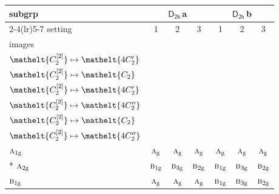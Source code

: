 \documentclass[10pt,a4paper]{article}
\numberwithin{equation}{section}
\newcommand{\eltfont}[1]{{\let\sigma\eltsigma\mathelt{#1}}}
\newcommand{\grp}[1]{\mathsf{#1}}
\newcommand{\irr}[1]{\text{\normalfont\scshape #1}}
\newcommand{\cls}[1]{\eltfont{#1}}
\newcommand{\ptag}[1]{\mathrm{#1}}
\newcommand{\clsletter}[1]{\,{\scriptsize\color{black!55}#1}}
\newcommand{\genidx}[2]{#1^{[\mathrm{#2}]}}
\begin{document}
{\small\begin{longtable}{@{}lcccccc@{}}\toprule
subgrp & \multicolumn{3}{c}{\href{D2h.pdf}{$\grp{D_{2h}}$}\clsletter{a}} & \multicolumn{3}{c}{\href{D2h.pdf}{$\grp{D_{2h}}$}\clsletter{b}}\\\cmidrule(lr){2-4}\cmidrule(lr){5-7}
setting & 1 & 2 & 3 & 1 & 2 & 3\\
images & {\scriptsize\begin{tabular}[t]{@{}c@{}}$\cls{\genidx{C_{2}}{1}} \mapsto \cls{C_{2}}$\\$\cls{\genidx{C_{2}}{2}} \mapsto \cls{4C_{2}'}$\end{tabular}} & {\scriptsize\begin{tabular}[t]{@{}c@{}}$\cls{\genidx{C_{2}}{1}} \mapsto \cls{4C_{2}'}$\\$\cls{\genidx{C_{2}}{2}} \mapsto \cls{C_{2}}$\end{tabular}} & {\scriptsize\begin{tabular}[t]{@{}c@{}}$\cls{\genidx{C_{2}}{1}} \mapsto \cls{4C_{2}'}$\\$\cls{\genidx{C_{2}}{2}} \mapsto \cls{4C_{2}'}$\end{tabular}} & {\scriptsize\begin{tabular}[t]{@{}c@{}}$\cls{\genidx{C_{2}}{1}} \mapsto \cls{C_{2}}$\\$\cls{\genidx{C_{2}}{2}} \mapsto \cls{4C_{2}''}$\end{tabular}} & {\scriptsize\begin{tabular}[t]{@{}c@{}}$\cls{\genidx{C_{2}}{1}} \mapsto \cls{4C_{2}''}$\\$\cls{\genidx{C_{2}}{2}} \mapsto \cls{C_{2}}$\end{tabular}} & {\scriptsize\begin{tabular}[t]{@{}c@{}}$\cls{\genidx{C_{2}}{1}} \mapsto \cls{4C_{2}''}$\\$\cls{\genidx{C_{2}}{2}} \mapsto \cls{4C_{2}''}$\end{tabular}}\\\midrule\endhead
\bottomrule\endfoot\endlastfoot
$\irr{a}_{1\ptag{g}}$ & $\irr{a}_{\ptag{g}}$ & $\irr{a}_{\ptag{g}}$ & $\irr{a}_{\ptag{g}}$ & $\irr{a}_{\ptag{g}}$ & $\irr{a}_{\ptag{g}}$ & $\irr{a}_{\ptag{g}}$\\*
$\irr{a}_{2\ptag{g}}$ & $\irr{b}_{1\ptag{g}}$ & $\irr{b}_{3\ptag{g}}$ & $\irr{b}_{2\ptag{g}}$ & $\irr{b}_{1\ptag{g}}$ & $\irr{b}_{3\ptag{g}}$ & $\irr{b}_{2\ptag{g}}$\\
$\irr{b}_{1\ptag{g}}$ & $\irr{a}_{\ptag{g}}$ & $\irr{a}_{\ptag{g}}$ & $\irr{a}_{\ptag{g}}$ & $\irr{b}_{1\ptag{g}}$ & $\irr{b}_{3\ptag{g}}$ & $\irr{b}_{2\ptag{g}}$\\

\end{longtable}}
\end{document}
